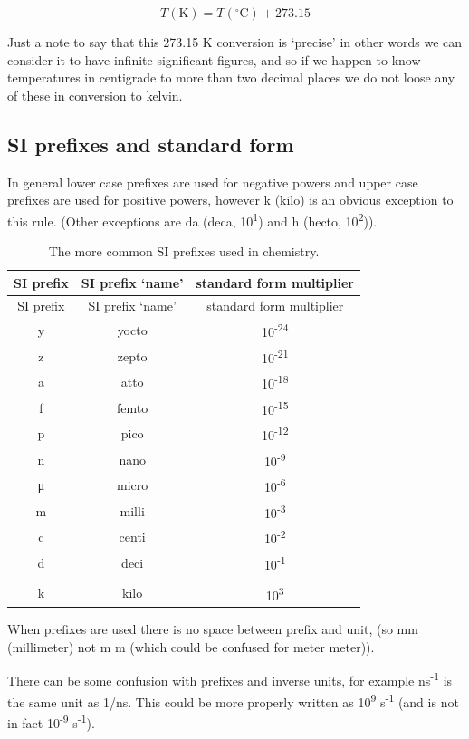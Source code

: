 \documentclass[
]{book}
\begin{document}
{
\begin{equation*}
T (\textrm{K}) = T (^\circ \textrm{C}) + 273.15
\end{equation*}
}

Just a note to say that this 273.15 K conversion is `precise' in other words we can consider it to have infinite significant figures, and so if we happen to know temperatures in centigrade to more than two decimal places we do not loose any of these in conversion to kelvin.

\hypertarget{si-prefixes-and-standard-form}{%
\subsection{SI prefixes and standard form}\label{si-prefixes-and-standard-form}}

In general lower case prefixes are used for negative powers and upper case prefixes are used for positive powers, however k (kilo) is an obvious exception to this rule. (Other exceptions are da (deca, 10\textsuperscript{1}) and h (hecto, 10\textsuperscript{2})).

\begin{longtable}[]{@{}ccc@{}}
\caption{\label{tab:SIprefix} The more common SI prefixes used in chemistry.}\tabularnewline
\toprule
SI prefix & SI prefix `name' & standard form multiplier\tabularnewline
\midrule
\endfirsthead
\toprule
SI prefix & SI prefix `name' & standard form multiplier\tabularnewline
\midrule
\endhead
y & yocto & 10\textsuperscript{-24}\tabularnewline
z & zepto & 10\textsuperscript{-21}\tabularnewline
a & atto & 10\textsuperscript{-18}\tabularnewline
f & femto & 10\textsuperscript{-15}\tabularnewline
p & pico & 10\textsuperscript{-12}\tabularnewline
n & nano & 10\textsuperscript{-9}\tabularnewline
μ & micro & 10\textsuperscript{-6}\tabularnewline
m & milli & 10\textsuperscript{-3}\tabularnewline
c & centi & 10\textsuperscript{-2}\tabularnewline
d & deci & 10\textsuperscript{-1}\tabularnewline
& &\tabularnewline
k & kilo & 10\textsuperscript{3}\tabularnewline
\bottomrule
\end{longtable}

When prefixes are used there is no space between prefix and unit, (so mm (millimeter) not m m (which could be confused for meter meter)).

There can be some confusion with prefixes and inverse units, for example ns\textsuperscript{-1} is the same unit as 1/ns. This could be more properly written as 10\textsuperscript{9} s\textsuperscript{-1} (and is not in fact 10\textsuperscript{-9} s\textsuperscript{-1}).
\end{document}
